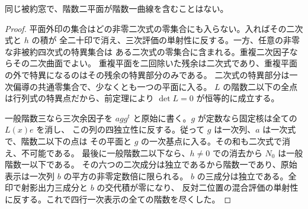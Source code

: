 \begin{corollary}\label{cor:rank-two-plane-independent-curves}
同じ被約窓で、階数二平面が階数一曲線を含むことはない。
\end{corollary}
\begin{proof}
平面外印の集合はどの非零二次式の零集合にも入らない。入ればその二次式と $h$ の積が
全二十印で消え、三次評価の単射性に反する。一方、任意の非零な非被約四次式の特異集合は
ある二次式の零集合に含まれる。重複二次因子ならその二次曲面でよい。
重複平面を二回除いた残余は二次式であり、重複平面の外で特異になるのはその残余の特異部分のみである。
二次式の特異部分は一次偏導の共通零集合で、少なくとも一つの平面に入る。
$L$ の階数二以下の全点は行列式の特異点だから、前定理により $\det L=0$ が恒等的に成立する。

一般階数三なら三次余因子を $a gg^t$ と原始に書く。$g$ が定数なら固定核は全ての $L(x)e$ を消し、
この列の四独立性に反する。従って $g$ は一次列、$a$ は一次式で、階数二以下の点は
その平面と $g$ の一次基点に入る。その和も二次式で消え、不可能である。
最後に一般階数二以下なら、$h\ne0$ での消去から $N_0$ は一般階数一以下である。
その六つの二次成分は独立であるから階数一であり、原始表示は一次列 $b$ の平方の非零定数倍に限られる。
$b$ の三成分は独立である。全印で射影出力三成分と $b$ の交代積が零になり、
反対二位置の混合評価の単射性に反する。これで四行一次表示の全ての階数を尽くした。
\end{proof}
